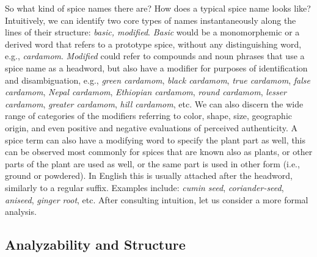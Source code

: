 So what kind of spice names there are? How does a typical spice name looks like? Intuitively, we can identify two core types of names instantaneously along the lines of their structure: \textit{basic, modified}. \textit{Basic} would be a monomorphemic or a derived word that refers to a prototype spice, without any distinguishing word, e.g., \textit{cardamom}. \textit{Modified} could refer to compounds and noun phrases that use a spice name as a headword, but also have a modifier for purposes of identification and disambiguation, e.g., \textit{green cardamom}, \textit{black cardamom}, \textit{true cardamom}, \textit{false cardamom}, \textit{Nepal cardamom}, \textit{Ethiopian cardamom}, \textit{round cardamom}, \textit{lesser cardamom}, \textit{greater cardamom}, \textit{hill cardamom}, etc. We can also discern the wide range of categories of the modifiers referring to color, shape, size, geographic origin, and even positive and negative evaluations of perceived authenticity. A spice term can also have a modifying word to specify the plant part as well, this can be observed most commonly for spices that are known also as plants, or other parts of the plant are used as well, or the same part is used in other form (i.e., ground or powdered). In English this is usually attached after the headword, similarly to a regular suffix. Examples include: \textit{cumin seed}, \textit{coriander-seed}, \textit{aniseed}, \textit{ginger root}, etc. After consulting intuition, let us consider a more formal analysis.



\subsection{Analyzability and Structure}

